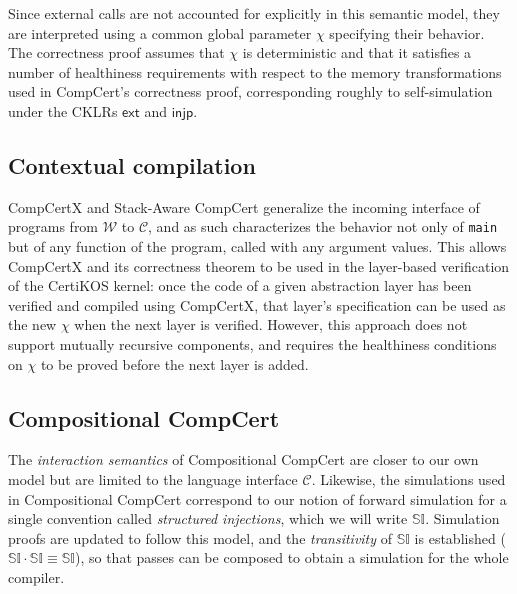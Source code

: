 \documentclass[11pt,oneside,draft]{book}
\theoremstyle{definition}
\newcommand{\kw}[1]{\ensuremath{ \mathsf{#1} }}
\begin{document}
Since external calls are not accounted for explicitly
in this semantic model,
they are interpreted %
using a common global parameter $\chi$
specifying their behavior.
The correctness proof assumes that $\chi$ is deterministic
and that it satisfies a number of healthiness requirements
with respect to the memory transformations
used in CompCert's correctness proof,
corresponding roughly to self-simulation
under the CKLRs $\kw{ext}$ and $\kw{injp}$.


\subsection{Contextual compilation} \label{sec:compcertx} %

CompCertX \citep{popl15} and
Stack-Aware CompCert \citep{stackaware}
generalize
the incoming interface of programs
from $\mathcal{W}$ to $\mathcal{C}$,
and as such characterizes the behavior
not only of \texttt{main}
but of any function of the program,
called with any argument values.
This allows CompCertX and its correctness theorem
to be used in the layer-based verification of
the CertiKOS kernel:
once the code of a given abstraction layer has been verified
and compiled using CompCertX,
that layer's specification can be used as the new $\chi$
when the next layer is verified.
However,
this approach does not support
mutually recursive components,
and requires the healthiness conditions on $\chi$
to be proved before the next layer is added.


\subsection{Compositional CompCert} %

The \emph{interaction semantics} of
Compositional CompCert \citep{compcompcert}
are closer to our own model
but are limited to the language interface $\mathcal{C}$.
Likewise, the simulations used in Compositional CompCert
correspond to our notion of forward simulation
for a single convention called \emph{structured injections},
which we will write $\mathbb{SI}$.
Simulation proofs are updated to follow this model,
and the \emph{transitivity} of $\mathbb{SI}$ is established
($\mathbb{SI} \cdot \mathbb{SI} \equiv \mathbb{SI}$),
so that passes can be composed
to obtain a simulation for the whole compiler.
\end{document}
